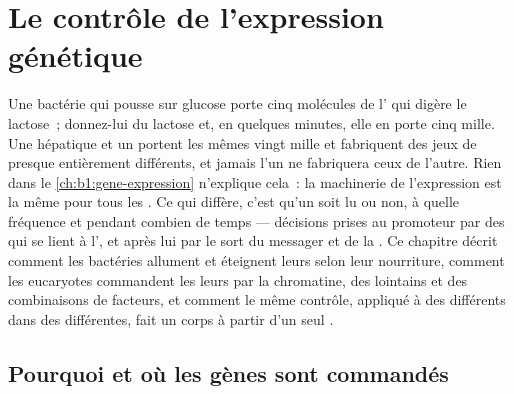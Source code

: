 \chapter{Le contrôle de l'expression génétique}\label{ch:b1:expression-control}

Une bactérie qui pousse sur glucose porte cinq molécules de l' qui
digère le lactose~; donnez-lui du lactose et, en quelques minutes, elle
en porte cinq mille. Une  hépatique et un  portent les
mêmes vingt mille  et fabriquent des jeux de  presque
entièrement différents, et jamais l'un ne fabriquera ceux de l'autre.
Rien dans le \cref{ch:b1:gene-expression} n'explique cela~: la
machinerie de l'expression est la même pour tous les . Ce qui
diffère, c'est qu'un  soit lu ou non, à quelle fréquence et pendant
combien de temps --- décisions prises au promoteur par des  qui
se lient à l', et après lui par le sort du messager et de la
. Ce chapitre décrit comment les bactéries allument et éteignent
leurs  selon leur nourriture, comment les eucaryotes commandent les
leurs par la chromatine, des  lointains et des
combinaisons de facteurs, et comment le même contrôle, appliqué à des
 différents dans des  différentes, fait un corps à partir
d'un seul .

\section{Pourquoi et où les gènes sont commandés}

